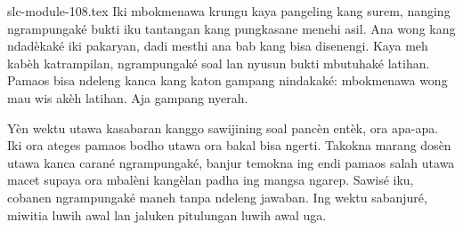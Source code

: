 \begin{filecontents*}[overwrite]{slc-module-108.tex}
Iki mbokmenawa krungu kaya pangeling kang
surem, nanging ngrampungaké bukti iku
tantangan kang pungkasane menehi asil.
Ana wong kang ndadèkaké iki pakaryan,
dadi mesthi ana bab kang bisa disenengi.
Kaya meh kabèh katrampilan, ngrampungaké
soal lan nyusun bukti mbutuhaké latihan.
Pamaos bisa ndeleng kanca kang katon
gampang nindakaké: mbokmenawa wong mau
wis akèh latihan. Aja gampang nyerah.

Yèn wektu utawa kasabaran kanggo sawijining
soal pancèn entèk, ora apa-apa. Iki ora ateges
pamaos bodho utawa ora bakal bisa ngerti.
Takokna marang dosèn utawa kanca carané
ngrampungaké, banjur temokna ing endi
pamaos salah utawa macet supaya ora
mbalèni kangèlan padha ing mangsa ngarep.
Sawisé iku, cobanen ngrampungaké maneh
tanpa ndeleng jawaban. Ing wektu sabanjuré,
miwitia luwih awal lan jaluken pitulungan
luwih awal uga.


\end{filecontents*}

